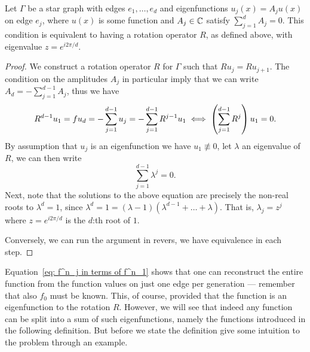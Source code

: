 \begin{proposition}\label{prop: lin-indep waves rotational symmetry}
  Let $\Gamma$ be a star graph with edges $e_1, \ldots, e_d$ and eigenfunctions $u_j(x) = A_j u(x)$ on edge $e_j$, where $u(x)$ is some function and $A_j \in \mathbb{C}$ satisfy $\sum_{j=1}^{d} A_j = 0$. This condition is equivalent to having a rotation operator $R$, as defined above, with eigenvalue $z = e^{i2\pi/d}$.
\end{proposition}
\begin{proof}
  We construct a rotation operator $R$ for $\Gamma$ such that $R u_j = R u_{j+1}$. The condition on the amplitudes $A_j$ in particular imply that we can write $A_d = -\sum_{j=1}^{d-1} A_j$, thus we have
  \begin{gather*}
    R^{d-1} u_1 = fu_d = - \sum_{j=1}^{d-1} u_j = - \sum_{j=1}^{d-1} R^{j-1}u_1
    \iff \left(\sum_{j=1}^{d-1} R^j\right) u_1 = 0.
  \end{gather*}
  By assumption that $u_j$ is an eigenfunction we have $u_1 \not\equiv 0$, let $\lambda$ an eigenvalue of $R$, we can then write
  \[
    \sum_{j=1}^{d-1} \lambda^j = 0.
  \]
  Next, note that the solutions to the above equation are precisely the non-real roots to $\lambda^d=1$, since $\lambda^d=1 = (\lambda-1)(\lambda^{d-1}+\ldots+\lambda)$. That is, $\lambda_j = z^j$ where $z = e^{i2\pi/d}$ is the $d$:th root of $1$.

  Conversely, we can run the argument in revers, we have equivalence in each step.
\end{proof}

Equation~\eqref{eq: f^n_j in terms of f^n_1} shows that one can reconstruct the entire function from the function values on just one edge per generation --- remember that also $f_0$ must be known. This, of course, provided that the function is an eigenfunction to the rotation $R$. However, we will see that indeed any function can be split into a sum of such eigenfunctions, namely the functions introduced in the following definition. But before we state the definition give some intuition to the problem through an example.

